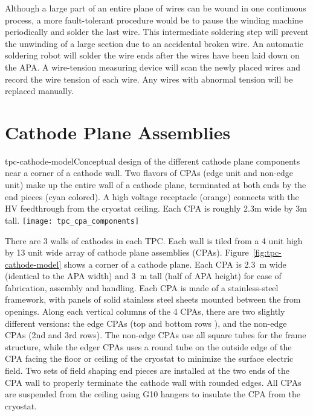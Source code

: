 Although a large part of an entire plane of wires can be wound in one continuous process, a more fault-tolerant procedure would be to pause the winding machine periodically and solder the last wire. This intermediate soldering step will prevent the unwinding of a large section due to an accidental broken wire.  An automatic soldering robot will solder the wire ends after the wires have been laid down on the APA. A wire-tension measuring device will scan the newly placed wires and record the wire tension of each wire. Any wires with abnormal tension will be replaced manually.



\section{Cathode Plane Assemblies}
\label{subsec:v5-tpc-chamber-cathode}


\begin{cdrfigure}{tpc-cathode-model}{Conceptual design of the different cathode plane components near a corner of a cathode wall.  Two flavors of CPAs (edge unit and non-edge unit) make up the entire wall of a cathode plane, terminated at both ends by the end pieces (cyan colored).  A high voltage receptacle (orange) connects with the HV feedthrough from the cryostat ceiling. Each CPA is roughly 2.3m wide by 3m tall.}
\texttt{[image: tpc\_cpa\_components]}
\end{cdrfigure}



There are 3 walls of cathodes in each TPC.  Each wall is tiled from a 4 unit high by 13 unit wide array of cathode plane assemblies (CPAs). Figure~\ref{fig:tpc-cathode-model} shows a corner of a cathode plane.  Each CPA is 2.3~m wide (identical to the APA width) and 3~m tall (half of APA height) for ease of fabrication, assembly and handling.  Each CPA is made of a stainless-steel framework, 
with panels of solid stainless steel sheets mounted between the from openings.  Along each vertical  columns of the 4 CPAs, there are two slightly different versions: the edge CPAs (top and bottom rows ), and the non-edge CPAs (2nd and 3rd rows).  The non-edge CPAs use all square tubes for the frame structure, while the edger CPAs uses a round tube on the outside edge of the CPA facing the floor or ceiling of the cryostat to minimize the surface electric field.  Two sets of field shaping end pieces are installed at the two ends of the CPA wall to properly terminate the cathode wall with rounded edges.  All CPAs are suspended from the ceiling using G10 hangers to insulate the CPA from the cryostat.


